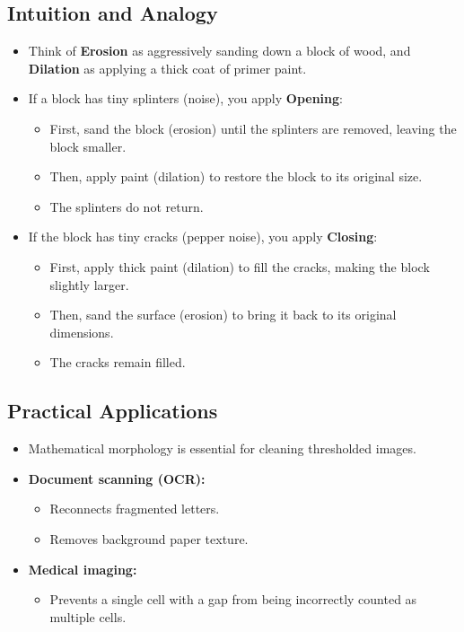 \documentclass[12pt]{article}
\begin{document}
\subsection{Intuition and Analogy}
\begin{itemize}
    \item Think of \textbf{Erosion} as aggressively sanding down a block of wood, and \textbf{Dilation} as applying a thick coat of primer paint.

    \item If a block has tiny splinters (noise), you apply \textbf{Opening}:
          \begin{itemize}
              \item First, sand the block (erosion) until the splinters are removed, leaving the block smaller.
              \item Then, apply paint (dilation) to restore the block to its original size.
              \item The splinters do not return.
          \end{itemize}

    \item If the block has tiny cracks (pepper noise), you apply \textbf{Closing}:
          \begin{itemize}
              \item First, apply thick paint (dilation) to fill the cracks, making the block slightly larger.
              \item Then, sand the surface (erosion) to bring it back to its original dimensions.
              \item The cracks remain filled.
          \end{itemize}
\end{itemize}

\subsection{Practical Applications}
\begin{itemize}
    \item Mathematical morphology is essential for cleaning thresholded images.

    \item \textbf{Document scanning (OCR):}
          \begin{itemize}
              \item Reconnects fragmented letters.
              \item Removes background paper texture.
          \end{itemize}

    \item \textbf{Medical imaging:}
          \begin{itemize}
              \item Prevents a single cell with a gap from being incorrectly counted as multiple cells.
          \end{itemize}
\end{itemize}
\end{document}
